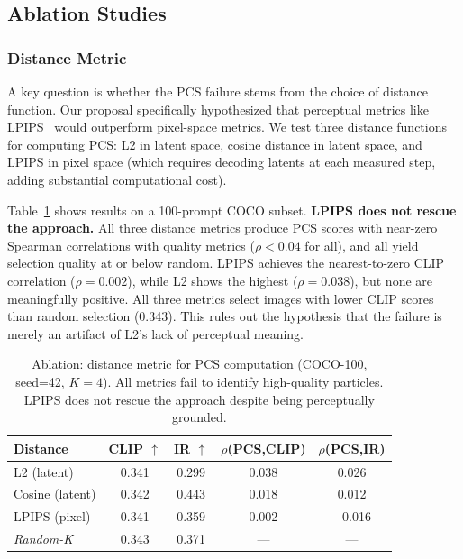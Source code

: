 \documentclass{article}
\newcommand{\pcs}{\textsc{PCS}}
\begin{document}
\subsection{Ablation Studies}

\subsubsection{Distance Metric}
\label{sec:ablation_distance}

A key question is whether the \pcs{} failure stems from the choice of distance function. Our proposal specifically hypothesized that perceptual metrics like LPIPS~\citep{zhang2018lpips} would outperform pixel-space metrics. We test three distance functions for computing \pcs{}: L2 in latent space, cosine distance in latent space, and LPIPS in pixel space (which requires decoding latents at each measured step, adding substantial computational cost).

Table~\ref{tab:ablation_distance} shows results on a 100-prompt COCO subset. \textbf{LPIPS does not rescue the approach.} All three distance metrics produce \pcs{} scores with near-zero Spearman correlations with quality metrics ($\rho < 0.04$ for all), and all yield selection quality at or below random. LPIPS achieves the nearest-to-zero CLIP correlation ($\rho = 0.002$), while L2 shows the highest ($\rho = 0.038$), but none are meaningfully positive. All three metrics select images with lower CLIP scores than random selection (0.343). This rules out the hypothesis that the failure is merely an artifact of L2's lack of perceptual meaning.

\begin{table}[t]
\centering
\caption{Ablation: distance metric for \pcs{} computation (COCO-100, seed=42, $K=4$). All metrics fail to identify high-quality particles. LPIPS does not rescue the approach despite being perceptually grounded.}
\label{tab:ablation_distance}
\small
\begin{tabular}{lcccc}
\toprule
Distance & CLIP $\uparrow$ & IR $\uparrow$ & $\rho$(\pcs{},CLIP) & $\rho$(\pcs{},IR) \\
\midrule
L2 (latent) & 0.341 & 0.299 & 0.038 & 0.026 \\
Cosine (latent) & 0.342 & 0.443 & 0.018 & 0.012 \\
LPIPS (pixel) & 0.341 & 0.359 & 0.002 & $-$0.016 \\
\midrule
\textit{Random-K} & 0.343 & 0.371 & --- & --- \\
\bottomrule
\end{tabular}
\end{table}
\end{document}
